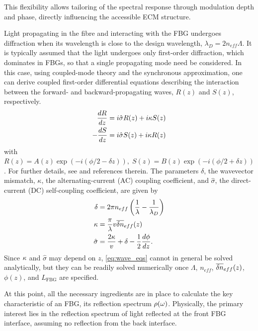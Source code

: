 This flexibility allows tailoring of the spectral response through modulation depth and phase, directly influencing the accessible ECM structure.
%
\par
%
Light propagating in the fibre and interacting with the FBG undergoes diffraction when its wavelength is close to the design wavelength, $\lambda_D = 2 n_{eff} \Lambda$.
It is typically assumed that the light undergoes only first-order diffraction, which dominates in FBGs, so that a single propagating mode need be considered.
In this case, using coupled-mode theory and the synchronous approximation, one can derive coupled first-order differential equations describing the interaction between the forward- and backward-propagating waves, $R(z)$ and $S(z)$, respectively.
%
\begin{equation}
\label{eq:wave_eqs}
    \begin{aligned}
        \frac{dR}{dz} &= i \hat{\sigma} R(z) + i \kappa S(z) \\
        -\frac{dS}{dz} &= i \hat{\sigma} S(z) + i \kappa R(z)
    \end{aligned}
\end{equation}
%
with $R(z) = A(z) \exp{ \left( -i \left( \phi/2 -\delta z \right) \right) }, \; S(z) = B(z) \exp{ \left( -i \left( \phi/2 + \delta z \right) \right) }$.
For further details, see \cite{erdogan1997fibre} and references therein.
The parameters $\delta$, the wavevector mismatch, $\kappa$, the alternating-current (AC) coupling coefficient, and $\hat{\sigma}$, the direct-current (DC) self-coupling coefficient, are given by
%
\begin{align}
    \label{eq:delta}
    \delta &= 2 \pi n_{eff} \left( \frac{1}{\lambda} - \frac{1}{\lambda_D} \right) \\
    \label{eq:kappa}
    \kappa &= \frac{\pi}{\lambda} v \overline{\delta n}_{eff}(z)\\
    \label{eq:sigma}
    \hat{\sigma} &= \frac{2\kappa}{v} + \delta -\frac{1}{2}\frac{d\phi}{dz}.
\end{align}
%
Since $\kappa$ and $\hat{\sigma}$ may depend on $z$, \eqref{eq:wave_eqs} cannot in general be solved analytically, but they can be readily solved numerically once $\Lambda$, $n_{eff}$, $\overline{\delta n}_{eff}(z)$, $\phi(z)$, and $L_\text{FBG}$ are specified.
%
\par
%
At this point, all the necessary ingredients are in place to calculate the key characteristic of an FBG, its reflection spectrum $\rho(\omega)$.
Physically, the primary interest lies in the reflection spectrum of light reflected at the front FBG interface, assuming no reflection from the back interface.
